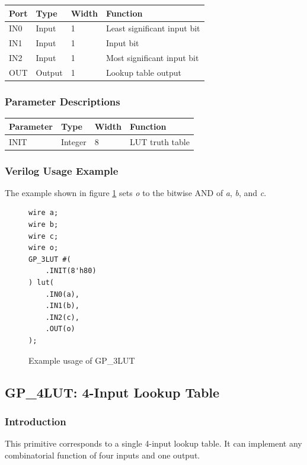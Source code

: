 \documentclass{article}
\begin{document}
\begin{tabularx}{4in}{|l|l|l|X|}
\hline
{\bfseries Port} & {\bfseries Type} & {\bfseries Width} & {\bfseries Function} \\
\hline
IN0 & Input & 1 & Least significant input bit \\
\hline
IN1 & Input & 1 & Input bit \\
\hline
IN2 & Input & 1 & Most significant input bit \\
\hline
OUT & Output & 1 & Lookup table output \\
\hline
\end{tabularx}

\subsubsection{Parameter Descriptions}

\begin{tabularx}{4in}{|l|l|l|X|}
\hline
{\bfseries Parameter} & {\bfseries Type} & {\bfseries Width} & {\bfseries Function} \\
\hline
INIT & Integer & 8 & LUT truth table \\
\hline
\end{tabularx}

\subsubsection{Verilog Usage Example}

The example shown in figure \ref{gp-3LUT-example} sets \emph{o} to the bitwise AND of \emph{a}, \emph{b}, and \emph{c}.

\begin{figure}[h]
\begin{lstlisting}
wire a;
wire b;
wire c;
wire o;
GP_3LUT #(
	.INIT(8'h80)
) lut(
	.IN0(a),
	.IN1(b),
	.IN2(c),
	.OUT(o)
);
\end{lstlisting}
\caption{Example usage of GP\_3LUT}
\label{gp-3LUT-example}
\end{figure}


\pagebreak
\subsection{GP\_4LUT: 4-Input Lookup Table}

\subsubsection{Introduction}
This primitive corresponds to a single 4-input lookup table. It can implement any combinatorial function of four 
inputs and one output.
\end{document}
